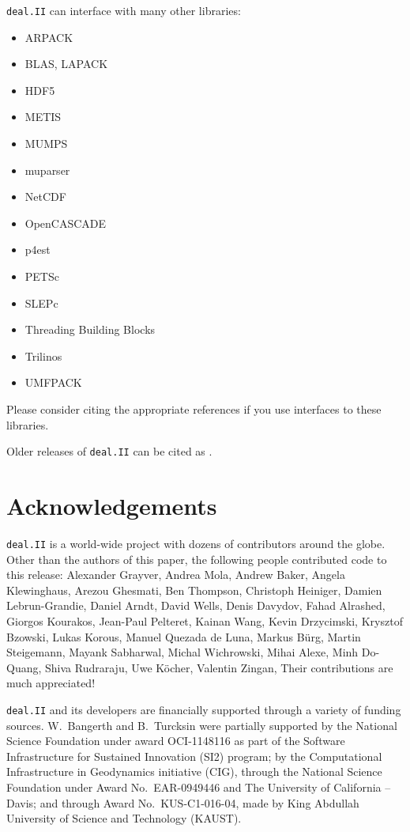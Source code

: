 \documentclass{ansarticle}
\newcommand{\specialword}[1]{\texttt{#1}}
\newcommand{\dealii}{{\specialword{deal.II}}}
\begin{document}
\dealii{} can interface with many other libraries:
\begin{itemize}
\item ARPACK \cite{arpack}
\item BLAS, LAPACK
\item HDF5 \cite{hdf5}
\item METIS \cite{karypis1998fast}
\item MUMPS \cite{ADE00,MUMPS:1,MUMPS:2,mumps-web-page}
\item muparser \cite{muparser-web-page}
\item NetCDF \cite{rew1990netcdf}
\item OpenCASCADE \cite{opencascade-web-page}
\item p4est \cite{p4est}
\item PETSc \cite{petsc-user-ref,petsc-web-page}
\item SLEPc \cite{Hernandez:2005:SSF}
\item Threading Building Blocks \cite{Rei07}
\item Trilinos \cite{trilinos,trilinos-web-page}
\item UMFPACK \cite{umfpack}
\end{itemize}
Please consider citing the appropriate references if you use interfaces to these
libraries.

Older releases of \dealii{} can be cited as \cite{dealII80,dealII81}.

\nocite{BangerthKanschat1999}

\section{Acknowledgements}

\dealii{} is a world-wide project with dozens of contributors around the
globe. Other than the authors of this paper, the following people contributed code to
this release:
Alexander Grayver,
Andrea Mola,
Andrew Baker,
Angela Klewinghaus,
Arezou Ghesmati,
Ben Thompson,
Christoph Heiniger,
Damien Lebrun-Grandie,
Daniel Arndt,
David Wells,
Denis Davydov,
Fahad Alrashed,
Giorgos Kourakos,
Jean-Paul Pelteret,
Kainan Wang,
Kevin Drzycimski,
Krysztof Bzowski,
Lukas Korous,
Manuel Quezada de Luna,
Markus Bürg,
Martin Steigemann,
Mayank Sabharwal,
Michal Wichrowski,
Mihai Alexe,
Minh Do-Quang,
Shiva Rudraraju,
Uwe Köcher,
Valentin Zingan,
Their contributions are much appreciated!


\dealii{} and its developers are financially supported through a
variety of funding sources. W.~Bangerth and B.~Turcksin were partially
supported by the National Science Foundation under award OCI-1148116
as part of the Software Infrastructure for Sustained Innovation (SI2)
program; by the Computational Infrastructure in Geodynamics initiative
(CIG), through the National Science Foundation under Award
No.~EAR-0949446 and The University of California -- Davis; and through
Award No.~KUS-C1-016-04, made by King Abdullah University of Science
and Technology (KAUST). 
\end{document}
